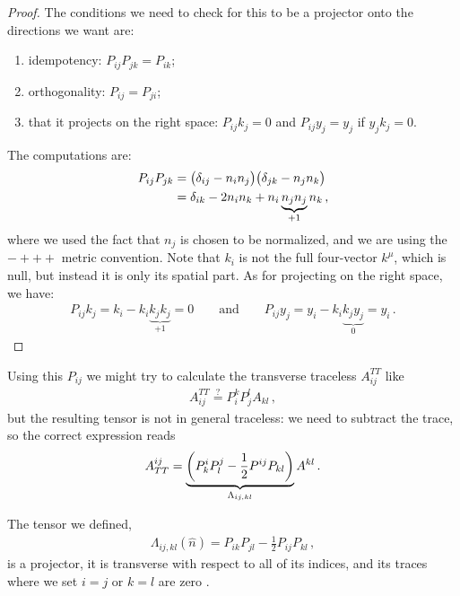 \documentclass[main.tex]{subfiles}
\begin{document}
\begin{proof}
The conditions we need to check for this to be a projector onto the directions we want are: 
\begin{enumerate}
    \item idempotency: \(P_{ij} P_{jk} = P_{ik}\);
    \item orthogonality: \(P_{ij} = P_{ji}\);
    \item that it projects on the right space: \(P_{ij} k_{j} = 0\) and \(P_{ij} y_{j} = y_{j}\) if \(y_{j} k_{j} = 0\).
\end{enumerate}

The computations are: 
%
\begin{align}
P_{ij} P_{jk} &= \qty(\delta_{ij} - n_i n_j)
\qty(\delta_{jk} - n_j n_k)  \\
&= \delta_{ik} - 2 n_i n_k + n_i \underbrace{n_j n_j}_{+1} n_k 
\,,
\end{align}
%
where we used the fact that \(n_j\) is chosen to be normalized, and we are using the \(- +++\) metric convention. Note that \(k_i\) is not the full four-vector \(k^{\mu }\), which is null, but instead it is only its spatial part. 
As for projecting on the right space, we have:
%
\begin{align}
P_{ij} k_j = k_i - k_i \underbrace{k_j k_j}_{+1} = 0
\qquad \text{and} \qquad
P_{ij} y_j = y_i - k_i \underbrace{k_j y_j}_{0} = y_i    
\,.
\end{align}
\end{proof}

Using this \(P_{ij}\) we might try to calculate the transverse traceless \(A_{ij}^{TT}\) like 
%
\begin{align}
A^{TT}_{ij} \overset{?}{=} P^{k}_{i} P^{l}_{j} A_{kl} 
\,,
\end{align}
%
but the resulting tensor is not in general traceless: we need to subtract the trace, so the correct expression reads
%
\begin{align}
A^{ij}_{TT} = \underbrace{\qty(P^{i}_{k} P^{j}_{l} - \frac{1}{2} P^{ij} P_{kl})}_{\Lambda_{ij, kl}} A^{kl}
\,.
\end{align}

The tensor we defined, 
%
\begin{align} \label{eq:lambda-projection-tensor}
\Lambda_{ij, kl} (\hat{n}) = P_{ik} P_{jl} - \frac{1}{2} P_{ij} P_{kl}
\,,
\end{align}
%
is a projector, it is transverse with respect to all of its indices, and its traces where we set \(i = j\) or \(k = l\) are zero \cite[eqs.\ 
1.36 to 1.39]{maggioreGravitationalWavesVolume2007}.
\end{document}
